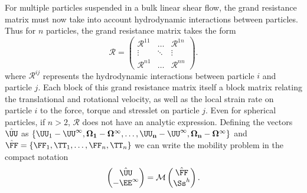 For multiple particles suspended in a bulk linear shear flow, the grand resistance matrix must now take into account hydrodynamic interactions between particles. Thus for $n$ particles, the grand resistance matrix takes the form
\[ \mathcal{R} = \begin{pmatrix} \mathcal{R}^{11} & \hdots & \mathcal{R}^{1n}\\ \vdots & \ddots &\vdots \\ \mathcal{R}^{n1} & \hdots & \mathcal{R}^{nn}\end{pmatrix}.\]
where $\mathcal{R}^{ij}$ represents the hydrodynamic interactions between particle $i$ and particle $j$. Each block of this grand resistance matrix itself a block matrix relating the translational and rotational velocity, as well as the local strain rate on particle $i$ to the force, torque and stresslet on particle $j$. Even for spherical particles, if $n >2$, $\mathcal{R}$ does not have an analytic expression. Defining the vectors $\hat{\UU}$ as $\{\UU_1 - \UU^\infty, \bf{\Omega}_1 - \bf{\Omega}^\infty, \hdots, \UU_n - \UU^\infty, \bf{\Omega}_n - \bf{\Omega}^\infty\}$ and $\hat{\FF} = \{\FF_1 ,\TT_1, \hdots, \FF_n, \TT_n\}$ we can write the mobility problem in the compact notation
\[ \begin{pmatrix} \hat{\UU} \\ -\EE^\infty\end{pmatrix} = \mathcal{M} \begin{pmatrix} \hat{\FF} \\ \Ss^h\end{pmatrix}.\]


